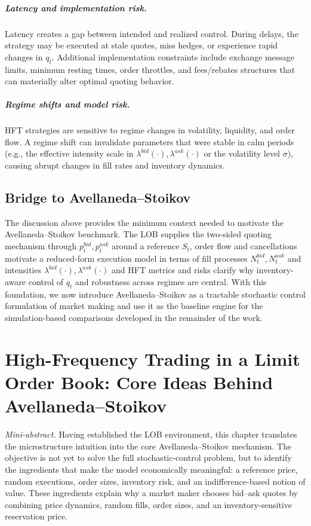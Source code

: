 \documentclass[a4paper,10pt,titlepage,oneside,openany]{book}
\theoremstyle{plain}\newtheorem{theorem}{Theorem}[chapter]
\theoremstyle{definition}\newtheorem{definition}{Definition}[chapter]
\theoremstyle{remark}\newtheorem{remark}{Remark}[chapter]
\newcommand{\miniabstract}[1]{%
\vspace{-2pt}
\begin{tcolorbox}[colback=gray!6,colframe=black!15,boxrule=0.3pt,arc=3pt,left=6pt,right=6pt,top=4pt,bottom=4pt]
\textit{Mini-abstract.} #1
\end{tcolorbox}
\vspace{-4pt}
}
\begin{document}
\paragraph{Latency and implementation risk.}
Latency creates a gap between intended and realized control. During delays, the strategy may be executed at stale quotes, miss hedges, or experience rapid changes in $q_t$. Additional implementation constraints include exchange message limits, minimum resting times, order throttles, and fees/rebates structures that can materially alter optimal quoting behavior.

\paragraph{Regime shifts and model risk.}
HFT strategies are sensitive to regime changes in volatility, liquidity, and order flow. A regime shift can invalidate parameters that were stable in calm periods (e.g., the effective intensity scale in $\lambda^{bid}(\cdot),\lambda^{ask}(\cdot)$ or the volatility level $\sigma$), causing abrupt changes in fill rates and inventory dynamics.

\section{Bridge to Avellaneda--Stoikov}
The discussion above provides the minimum context needed to motivate the Avellaneda--Stoikov benchmark. The LOB supplies the two-sided quoting mechanism through $p_t^{bid},p_t^{ask}$ around a reference $S_t$, order flow and cancellations motivate a reduced-form execution model in terms of fill processes $N_t^{bid},N_t^{ask}$ and intensities $\lambda^{bid}(\cdot),\lambda^{ask}(\cdot)$ and HFT metrics and risks clarify why inventory-aware control of $q_t$ and robustness across regimes are central. With this foundation, we now introduce Avellaneda--Stoikov as a tractable stochastic control formulation of market making and use it as the baseline engine for the simulation-based comparisons developed in the remainder of the work.

\chapter{High-Frequency Trading in a Limit Order Book: Core Ideas Behind Avellaneda--Stoikov}
\label{sec:hft_lob_core_ideas}
\miniabstract{Having established the LOB environment, this chapter translates the microstructure intuition into the core Avellaneda--Stoikov mechanism. The objective is not yet to solve the full stochastic-control problem, but to identify the ingredients that make the model economically meaningful: a reference price, random executions, order sizes, inventory risk, and an indifference-based notion of value. These ingredients explain why a market maker chooses bid--ask quotes by combining price dynamics, random fills, order sizes, and an inventory-sensitive reservation price.}
\end{document}
